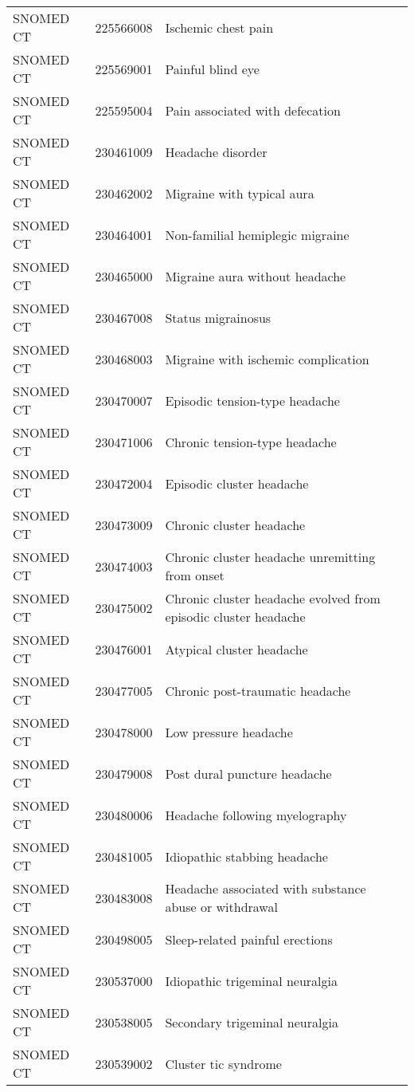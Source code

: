 \begin{longtable}{p{}p{}p{}}
  SNOMED CT & 225566008 & Ischemic chest pain \\ 
  SNOMED CT & 225569001 & Painful blind eye \\ 
  SNOMED CT & 225595004 & Pain associated with defecation \\ 
  SNOMED CT & 230461009 & Headache disorder \\ 
  SNOMED CT & 230462002 & Migraine with typical aura \\ 
  SNOMED CT & 230464001 & Non-familial hemiplegic migraine \\ 
  SNOMED CT & 230465000 & Migraine aura without headache \\ 
  SNOMED CT & 230467008 & Status migrainosus \\ 
  SNOMED CT & 230468003 & Migraine with ischemic complication \\ 
  SNOMED CT & 230470007 & Episodic tension-type headache \\ 
  SNOMED CT & 230471006 & Chronic tension-type headache \\ 
  SNOMED CT & 230472004 & Episodic cluster headache \\ 
  SNOMED CT & 230473009 & Chronic cluster headache \\ 
  SNOMED CT & 230474003 & Chronic cluster headache unremitting from onset \\ 
  SNOMED CT & 230475002 & Chronic cluster headache evolved from episodic cluster headache \\ 
  SNOMED CT & 230476001 & Atypical cluster headache \\ 
  SNOMED CT & 230477005 & Chronic post-traumatic headache \\ 
  SNOMED CT & 230478000 & Low pressure headache \\ 
  SNOMED CT & 230479008 & Post dural puncture headache \\ 
  SNOMED CT & 230480006 & Headache following myelography \\ 
  SNOMED CT & 230481005 & Idiopathic stabbing headache \\ 
  SNOMED CT & 230483008 & Headache associated with substance abuse or withdrawal \\ 
  SNOMED CT & 230498005 & Sleep-related painful erections \\ 
  SNOMED CT & 230537000 & Idiopathic trigeminal neuralgia \\ 
  SNOMED CT & 230538005 & Secondary trigeminal neuralgia \\ 
  SNOMED CT & 230539002 & Cluster tic syndrome \\ 

\end{longtable}
